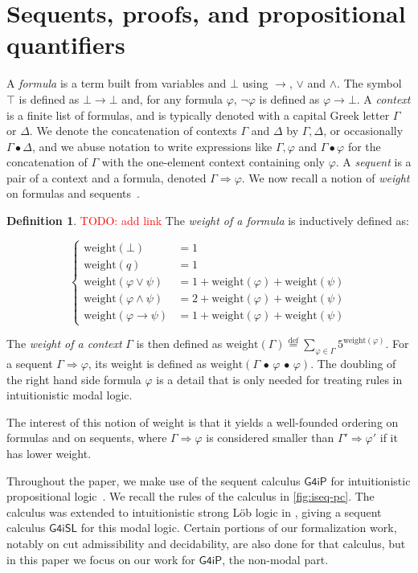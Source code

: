 \documentclass[english,review]{jflart}
\theoremstyle{definition}
\newtheorem{definition}{Definition}
\theoremstyle{plain}
\renewcommand{\phi}{\varphi}
\newcommand{\weight}{\text{weight}}
\newcommand{\Gfourip}{\mathsf{G4iP}}
\newcommand{\Gfourisl}{\mathsf{G4iSL}}
\newcommand{\isdef}{\stackrel{\mathrm{def}}{=}}
\newcommand{\cons}{\,\bullet\,}
\newcommand{\sam}[1]{\textcolor{red}{#1}}
\begin{document}
\section{Sequents, proofs, and propositional quantifiers}\label{sec:prelims}
A \emph{formula} is a term built from variables and $\bot$ using $\to$, $\vee$ and $\wedge$. The symbol $\top$ is defined as $\bot \to \bot$ and, for any formula $\phi$, $\neg \phi$ is defined as $\phi \to \bot$. A \emph{context} is a finite list of formulas, and is typically denoted with a capital Greek letter $\Gamma$ or $\Delta$. We denote the concatenation of contexts $\Gamma$ and $\Delta$ by $\Gamma, \Delta$, or occasionally $\Gamma \bullet \Delta$, and we abuse notation to write expressions like $\Gamma, \phi$ and $\Gamma \bullet \phi$ for the concatenation of $\Gamma$ with the one-element context containing only $\phi$. A \emph{sequent} is a pair of a context and a formula, denoted $\Gamma \Rightarrow \phi$. We now recall a notion of \emph{weight} on formulas and sequents~\cite{Pit1992}. 
%
\begin{definition}\label{dfn:weight}
    \sam{TODO: add link} The \emph{weight of a formula} is inductively defined as:

$$\left\{
\begin{array}{rl}
      \weight(\bot) &= 1 \\
      \weight(q) &= 1 \\
      \weight(\phi \lor \psi) &= 1 + \weight (\phi) + \weight (\psi) \\
      \weight(\phi \land \psi) &= 2 + \weight (\phi) + \weight (\psi) \\
      \weight(\phi \rightarrow \psi) &= 1 + \weight (\phi) + \weight (\psi)
\end{array}
\right.$$

The \emph{weight of a context} $\Gamma$ is then defined as $\weight(\Gamma) \isdef \sum_{\phi \in \Gamma} 5^{\weight(\phi)}$. For a sequent $\Gamma \Rightarrow \phi$, its weight is defined as $\weight(\Gamma \cons \phi \cons \phi)$. The doubling of the right hand side formula $\phi$ is a detail that is only needed for treating rules in intuitionistic modal logic.
\end{definition}
The interest of this notion of weight is that it yields a well-founded ordering on formulas and on sequents, where $\Gamma \Rightarrow \phi$ is considered smaller than $\Gamma' \Rightarrow \phi'$ if it has lower weight.

Throughout the paper, we make use of the sequent calculus $\Gfourip$ for intuitionistic propositional logic~\cite{Vor1952,Hud1988,Dyc1992}. We recall the rules of the calculus in \cref{fig:iseq-pc}. The calculus was extended to intuitionistic strong Löb logic in \cite{Shillito23}, giving a sequent calculus $\Gfourisl$ for this modal logic. Certain portions of our formalization work, notably on cut admissibility and decidability, are also done for that calculus, but in this paper we focus on our work for $\Gfourip$, the non-modal part.
\end{document}
